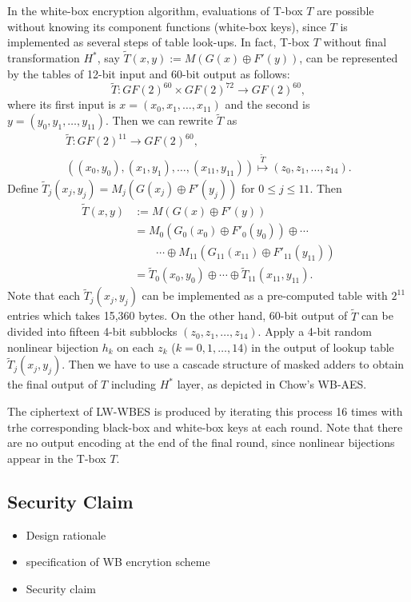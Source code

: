 \documentclass{ieeeaccess}
\begin{document}
In the white-box encryption algorithm,
evaluations of T-box $T$ are possible without knowing its component functions (white-box keys),
since $T$ is implemented as several steps of table look-ups.
In fact, T-box $T$ without final transformation $H^*$, 
say $\tilde T(x,y):= M(G(x)\oplus F'(y))$, can be represented
by the tables of 12-bit input and 60-bit output as follows:
\[
\tilde T: GF(2)^{60} \times GF(2)^{72} \to GF(2)^{60}, 
\]
where its first input is $x = (x_0, x_1, \ldots, x_{11})$  
and the second is $y = (y_0, y_1, \ldots , y_{11})$.
Then we can rewrite $\tilde T$ as  
\begin{gather*}
\tilde T: GF(2)^{11} \to GF(2)^{60},\\
\left( (x_0, y_0), (x_1, y_1), \ldots, (x_{11}, y_{11}) \right)
\stackrel{\tilde T}{\mapsto} (z_0, z_1, \ldots, z_{14}).
\end{gather*}
Define $\tilde T_j(x_j, y_j) = M_j( G(x_j) \oplus F'(y_j))$ for
$0\le j \le 11$.
Then 
\begin{align*}
\tilde T(x,y) & := M(G(x)\oplus F'(y)) \\
&= M_0(G_0(x_0)\oplus F'_0(y_0)) \oplus \cdots \\
& \quad\quad \cdots\oplus M_{11}(G_{11}(x_{11}) \oplus F'_{11}(y_{11})) \\
&= \tilde T_0(x_0, y_0) \oplus \cdots \oplus \tilde T_{11}(x_{11}, y_{11}).
\end{align*}
Note that each $\tilde T_j(x_j, y_j)$ can be implemented
as a pre-computed table with $2^{11}$ entries which takes 15,360 bytes.
On the other hand, 60-bit output of $\tilde T$ can be divided into 
fifteen 4-bit subblocks $(z_0, z_1, \ldots, z_{14})$.
Apply a 4-bit random nonlinear bijection $h_k$ on each $z_k$ ($k=0,1,\ldots, 14)$
in the output of lookup table $\tilde T_j(x_j, y_j)$. Then
we have to use a cascade structure of masked adders 
to obtain the final output of $T$ including $H^*$ layer, 
as depicted in Chow's WB-AES.

The ciphertext of LW-WBES is produced by iterating this process 16 times
with trhe corresponding black-box and white-box keys at each round.
Note that there are no output encoding at the end of the final round,
since nonlinear bijections appear in the T-box $T$.

\subsection{Security Claim}

\begin{itemize}
\item Design rationale
\item specification of WB encrytion scheme
\item Security claim
\end{itemize}
\end{document}
